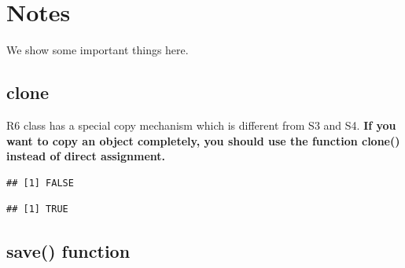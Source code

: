 \documentclass[
]{book}
\newenvironment{Shaded}{\begin{snugshade}}{\end{snugshade}}
\newcommand{\CommentTok}[1]{\textcolor[rgb]{0.56,0.35,0.01}{\textit{#1}}}
\newcommand{\ConstantTok}[1]{\textcolor[rgb]{0.00,0.00,0.00}{#1}}
\newcommand{\FunctionTok}[1]{\textcolor[rgb]{0.00,0.00,0.00}{#1}}
\newcommand{\NormalTok}[1]{#1}
\newcommand{\OtherTok}[1]{\textcolor[rgb]{0.56,0.35,0.01}{#1}}
\newcommand{\SpecialCharTok}[1]{\textcolor[rgb]{0.00,0.00,0.00}{#1}}
\begin{document}
\hypertarget{notes}{%
\chapter{Notes}\label{notes}}

We show some important things here.

\hypertarget{clone}{%
\section{clone}\label{clone}}

R6 class has a special copy mechanism which is different from S3 and S4.
\textbf{If you want to copy an object completely, you should use the function clone() instead of direct assignment.}

\begin{Shaded}
\end{Shaded}

\begin{verbatim}
## [1] FALSE
\end{verbatim}

\begin{Shaded}
\end{Shaded}

\begin{verbatim}
## [1] TRUE
\end{verbatim}

\hypertarget{save-function}{%
\section{save() function}\label{save-function}}
\end{document}
